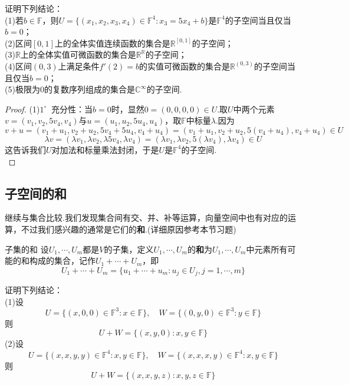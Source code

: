 \documentclass[lang=cn, zihao=5]{elegantbook}
\newcommand{\R}{\mathbb{R}}
\newcommand{\C}{\mathbb{C}}
\newcommand{\F}{\mathbb{F}}
\newcommand{\buzhou}[1]{$#1^{\circ} \ $}
\begin{document}
\begin{example}
    证明下列结论：\\
    (1)若$b \in \F$，则$U = \{ (x_1,x_2,x_3,x_4) \in \F ^{4} : x_3 = 5x_4+b \}$是$\F ^{4}$的子空间当且仅当$b=0$； \\
    (2)区间$[0,1]$上的全体实值连续函数的集合是$\R ^{[0,1]}$的子空间； \\
    (3)$\R$上的全体实值可微函数的集合是$\R ^{\R}$的子空间； \\
    (4)区间$(0,3)$上满足条件$f'(2)=b$的实值可微函数的集合是$\R ^{(0,3)}$的子空间当且仅当$b=0$； \\
    (5)极限为$0$的复数序列组成的集合是$\C ^{\infty}$的子空间.
\end{example}
\begin{proof}
	(1)\buzhou{1} 充分性：当$b=0$时，显然$0=(0,0,0,0) \in U$.取$U$中两个元素$v=(v_1,v_2,5v_4,v_4)$与$u=(u_1,u_2,5u_4,u_4)$，取$\F$中标量$\lambda$.因为
	$$v+u = (v_1+u_1,v_2+u_2,5v_4+5u_4,v_4+u_4) = (v_1+u_1,v_2+u_2,5(v_4+u_4),v_4+u_4) \in U$$
	$$\lambda v = (\lambda v_1,\lambda v_2,\lambda 5v_4,\lambda v_4) = (\lambda v_1,\lambda v_2,5(\lambda v_4),\lambda v_4) \in U$$
	这告诉我们$U$对加法和标量乘法封闭，于是$U$是$\F ^{4}$的子空间. \\
	
\end{proof}

\subsection{子空间的和}

继续与集合比较.我们发现集合间有交、并、补等运算，向量空间中也有对应的运算，不过我们感兴趣的通常是它们的\textbf{和}.(详细原因参考本节习题)

\begin{definition}{子集的和}
    设$U_1,\cdots ,U_m$都是$V$的子集，定义$U_1, \cdots ,U_m$的\textbf{和}为$U_1, \cdots ,U_m$中元素所有可能的和构成的集合，记作$U_1+ \cdots +U_m$，即$$U_1+ \cdots +U_m = \{ u_1+ \cdots +u_m : u_j \in U_j,j=1, \cdots ,m \}$$
\end{definition}

\begin{example}
    证明下列结论： \\
    (1)设$$U = \{ (x,0,0) \in \F ^{3} : x \in \F \} , \quad W = \{ (0,y,0) \in \F ^{3} : y \in \F \}$$
    则$$U+W = \{ (x,y,0) : x,y \in \F \}$$
    (2)设$$U = \{ (x,x,y,y) \in \F ^{4} : x,y \in \F \} , \quad W = \{ (x,x,x,y) \in \F ^{4} : x,y \in \F \}$$
    则$$U+W = \{ (x,x,y,z) : x,y,z \in \F \}$$
\end{example}
\end{document}
